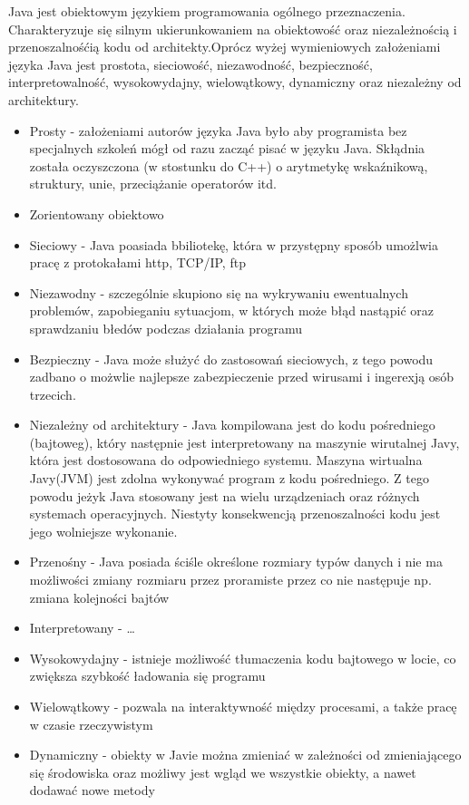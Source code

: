 \documentclass[eng,printmode,oneside]{mgr}
\begin{document}
Java jest obiektowym językiem programowania ogólnego przeznaczenia.
Charakteryzuje się silnym ukierunkowaniem na obiektowość oraz niezależnością i
przenoszalnośćią kodu od architekty.Oprócz wyżej wymieniowych założeniami języka
Java jest prostota, sieciowość, niezawodność, bezpieczność, interpretowalność, wysokowydajny,
wielowątkowy, dynamiczny oraz niezależny od architektury. 
\begin{itemize}
  \item Prosty - założeniami autorów języka Java było aby programista bez
  specjalnych szkoleń mógł od razu zacząć pisać w języku Java. Skłądnia została
  oczyszczona (w stostunku do C++) o arytmetykę wskaźnikową, struktury, unie,
  przeciążanie operatorów itd.
  \item Zorientowany obiektowo
  \item Sieciowy - Java poasiada bbiliotekę, która w przystępny sposób umożlwia
  pracę z protokałami http, TCP/IP, ftp
  \item Niezawodny - szczególnie skupiono się na wykrywaniu ewentualnych
  problemów, zapobieganiu sytuacjom, w których może błąd nastąpić oraz
  sprawdzaniu błedów podczas działania programu
  \item Bezpieczny - Java może służyć do zastosowań sieciowych, z tego powodu
  zadbano o możwlie najlepsze zabezpieczenie przed wirusami i ingerexją osób
  trzecich.
  \item Niezależny od architektury - Java kompilowana jest do kodu pośredniego
  (bajtoweg), który następnie jest interpretowany na maszynie wirutalnej Javy,
  która jest dostosowana do odpowiedniego systemu. Maszyna wirtualna Javy(JVM)
  jest zdolna wykonywać program z kodu pośredniego. Z tego powodu jeżyk Java
  stosowany jest na wielu urządzeniach oraz różnych systemach operacyjnych.
  Niestyty konsekwencją przenoszalności kodu jest jego wolniejsze wykonanie.
  \item Przenośny - Java posiada ściśle określone rozmiary typów danych i nie ma
  możliwości zmiany rozmiaru przez proramiste przez co nie następuje np. zmiana
  kolejności bajtów
  \item Interpretowany - \ldots
  \item Wysokowydajny - istnieje możliwość tłumaczenia kodu bajtowego w locie,
  co zwiększa szybkość ładowania się programu
  \item Wielowątkowy - pozwala na interaktywność między procesami, a także pracę
  w czasie rzeczywistym
  \item Dynamiczny - obiekty w Javie można zmieniać w zależności od
  zmieniającego się środowiska oraz możliwy jest wgląd we wszystkie obiekty, a
  nawet dodawać nowe metody
\end{itemize}
\end{document}
